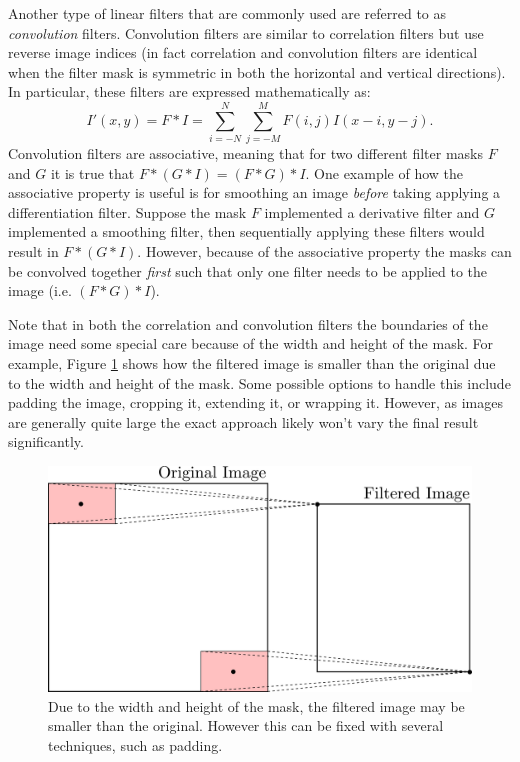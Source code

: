 Another type of linear filters that are commonly used are referred to as \textit{convolution} filters. Convolution filters are similar to correlation filters but use reverse image indices (in fact correlation and convolution filters are identical when the filter mask is symmetric in both the horizontal and vertical directions). In particular, these filters are expressed mathematically as:
\begin{equation}
  \label{eq:convolution}
    I'(x,y) = F \ast I = \sum_{i=-N}^N \sum_{j=-M}^M F(i,j)I(x-i,y-j).
\end{equation}
Convolution filters are associative, meaning that for two different filter masks $F$ and $G$ it is true that $F*(G*I) = (F*G)*I$. One example of how the associative property is useful is for smoothing an image \textit{before} taking applying a differentiation filter. Suppose the mask $F$ implemented a derivative filter and $G$ implemented a smoothing filter, then sequentially applying these filters would result in $F*(G*I)$. However, because of the associative property the masks can be convolved together \textit{first} such that only one filter needs to be applied to the image (i.e. $(F*G)*I$).

Note that in both the correlation and convolution filters the boundaries of the image need some special care because of the width and height of the mask. For example, Figure \ref{fig:nopaddingexample} shows how the filtered image is smaller than the original due to the width and height of the mask. Some possible options to handle this include padding the image, cropping it, extending it, or wrapping it. However, as images are generally quite large the exact approach likely won't vary the final result significantly.
\begin{figure}[ht]
  \centering
  \includegraphics[width=.65\textwidth]{tex/figs/ch10_figs/centerfilter_nopadding.png}
    \caption{Due to the width and height of the mask, the filtered image may be smaller than the original. However this can be fixed with several techniques, such as padding.}
    \label{fig:nopaddingexample}
\end{figure}

